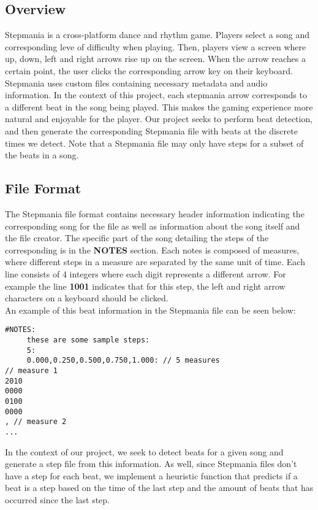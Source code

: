 \subsection{Overview}

Stepmania is a cross-platform dance and rhythm game. Players select a song and corresponding leve of difficulty when playing. Then, players view a screen where up, down, left and right arrows rise up on the screen. When the arrow reaches a certain point, the user clicks the corresponding arrow key on their keyboard.\\

Stepmania uses custom files containing necessary metadata and audio information. In the context of this project, each stepmania arrow corresponds to a different beat in the song being played. This makes the gaming experience more natural and enjoyable for the player. Our project seeks to perform beat detection, and then generate the corresponding Stepmania file with beats at the discrete times we detect. Note that a Stepmania file may only have steps for a subset of the beats in a song.\\

\subsection{File Format}

The Stepmania file format contains necessary header information indicating the corresponding song for the file as well as information about the song itself and the file creator. The specific part of the song detailing the steps of the corresponding is in the \textbf{NOTES} section. Each notes is composed of measures, where different steps in a measure are separated by the same unit of time. Each line consists of 4 integers where each digit represents a different arrow. For example the line \textbf{1001} indicates that for this step, the left and right arrow characters on a keyboard should be clicked.\\

An example of this beat information in the Stepmania file can be seen below:\\
\begin{lstlisting}
#NOTES:
     these are some sample steps:
     5:
     0.000,0.250,0.500,0.750,1.000: // 5 measures
// measure 1
2010
0000
0100
0000
, // measure 2
...
\end{lstlisting}

In the context of our project, we seek to detect beats for a given song and generate a step file from this information. As well, since Stepmania files don't have a step for each beat, we implement a heuristic function that predicts if a beat is a step based on the time of the last step and the amount of beats that has occurred since the last step.\\

